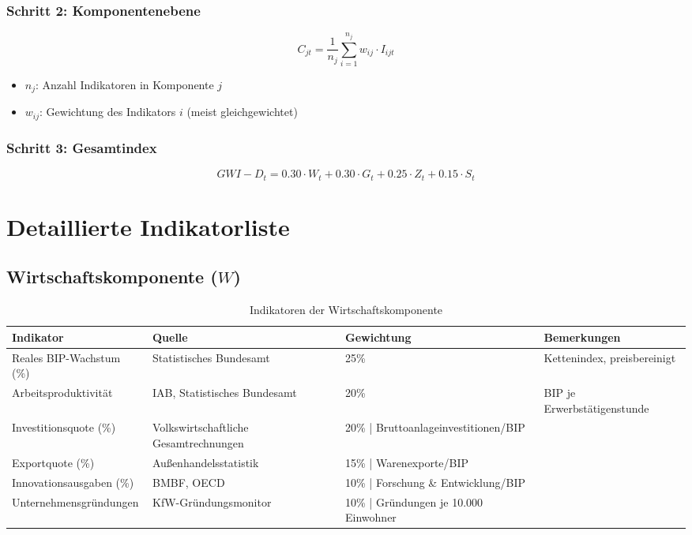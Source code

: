 \subsubsection{Schritt 2: Komponentenebene}

\[
C_{jt} = \frac{1}{n_j} \sum_{i=1}^{n_j} w_{ij} \cdot I_{ijt}
\]

\begin{itemize}
    \item \(n_j\): Anzahl Indikatoren in Komponente \(j\)
    \item \(w_{ij}\): Gewichtung des Indikators \(i\) (meist gleichgewichtet)
\end{itemize}

\subsubsection{Schritt 3: Gesamtindex}

\[
GWI-D_t = 0.30 \cdot W_t + 0.30 \cdot G_t + 0.25 \cdot Z_t + 0.15 \cdot S_t
\]

\section{Detaillierte Indikatorliste}

\subsection{Wirtschaftskomponente (\(W\))}

\begin{table}[ht]
    \centering
    \caption{Indikatoren der Wirtschaftskomponente}
    \label{tab:indikatoren_wirtschaft}
    \begin{tabular}{llll}
        \toprule
        \textbf{Indikator} & \textbf{Quelle} & \textbf{Gewichtung} & \textbf{Bemerkungen} \\
        \midrule
        Reales BIP-Wachstum (\%) & Statistisches Bundesamt & 25\% & Kettenindex, preisbereinigt \\
        Arbeitsproduktivität & IAB, Statistisches Bundesamt & 20\% & BIP je Erwerbstätigenstunde \\
        Investitionsquote (\%) & Volkswirtschaftliche Gesamtrechnungen & 20\% | Bruttoanlageinvestitionen/BIP \\
        Exportquote (\%) & Außenhandelsstatistik & 15\% | Warenexporte/BIP \\
        Innovationsausgaben (\%) & BMBF, OECD & 10\% | Forschung \& Entwicklung/BIP \\
        Unternehmensgründungen & KfW-Gründungsmonitor & 10\% | Gründungen je 10.000 Einwohner \\
        \bottomrule
    \end{tabular}
\end{table}

